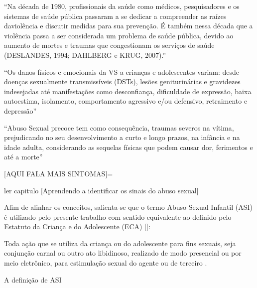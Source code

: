 ``Na década de 1980, profissionais da saúde como médicos, pesquisadores e os sistemas de  saúde  pública  passaram  a  se  dedicar  a  compreender  as  raízes  daviolência  e  discutir medidas   para   sua   prevenção.   É   também   nessa   década   que   a   violência   passa   a   ser considerada  um  problema  de  saúde  pública,  devido  ao  aumento  de  mortes  e  traumas  que congestionam os serviços de saúde (DESLANDES, 1994; DAHLBERG e KRUG, 2007).'' %

``Os danos físicos e emocionais da VS a crianças e adolescentes variam: desde doenças sexualmente transmissíveis (DSTs), lesões geniturinárias e gravidezes indesejadas até manifestações como desconfiança, dificuldade de expressão, baixa autoestima, isolamento, comportamento agressivo e/ou defensivo, retraimento e depressão'' %

``Abuso Sexual precoce tem como consequência, traumas severos na vítima, prejudicando no seu desenvolvimento a curto e longo prazos, na infância e na idade adulta, considerando as sequelas físicas que podem causar dor, ferimentos e até a morte'' %

[AQUI FALA MAIS SINTOMAS]= %


ler capitulo [Aprendendo a identificar os sinais do abuso sexual] %



Afim de alinhar os conceitos, salienta-se que o termo Abuso Sexual Infantil (ASI) é utilizado pelo presente trabalho com sentido equivalente ao definido pelo Estatuto da Criança e do Adolescente (ECA) []: 

\begin{citacao}
  Toda ação que se utiliza da criança ou do adolescente para fins sexuais, seja conjunção carnal ou outro ato libidinoso, realizado de modo presencial ou por meio eletrônico, para estimulação sexual do agente ou de terceiro \cite{federal1990estatuto}.
\end{citacao}



A definição de ASI










